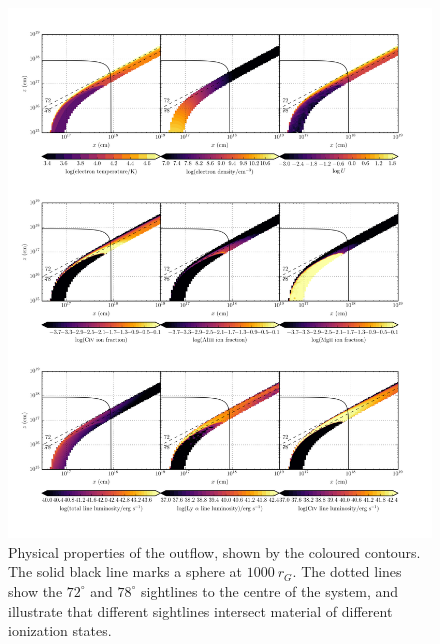 \documentclass[preprint, a4paper, 11pt]{aastex}
\begin{document}
\begin{figure} %
\centering
\includegraphics[width=1.0\textwidth]{figures/link.png}
\caption
{
Physical properties of the outflow, shown by the coloured contours.
The solid black line marks a sphere at $1000~r_G$.
The dotted lines show the $72^\circ$ and $78^\circ$ sightlines 
to the centre of the system, and illustrate that different sightlines
intersect material of different ionization states.
}
\label{fig:wind}
\end{figure} %
\end{document}
